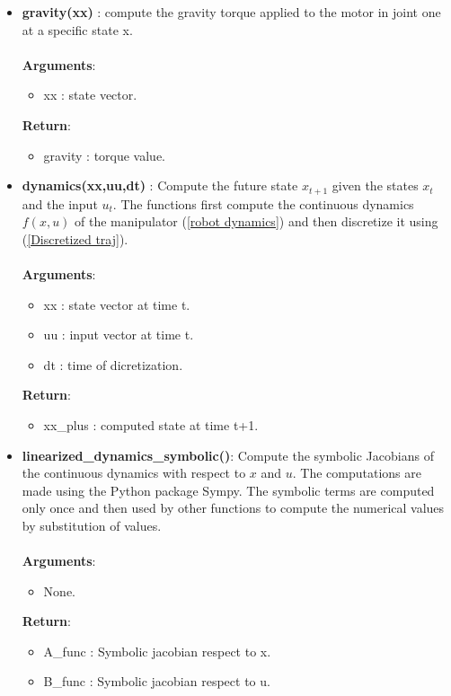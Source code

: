 \begin{itemize}
    \item \textbf{gravity(xx) }: compute the gravity torque applied to the motor in joint one at a specific state x.\\\\
    \textbf{Arguments}:
    \begin{itemize}
        \item xx : state vector.
    \end{itemize}
    \textbf{Return}:
    \begin{itemize}
        \item gravity : torque value.
    \end{itemize}

    \item \textbf{dynamics(xx,uu,dt) }: Compute the future state $x_{t+1}$ given the states $x_t$ and the input $u_t$. The functions first compute the continuous dynamics $f(x,u)$ of the manipulator (\ref{robot dynamics}) and then discretize it using (\ref{Discretized traj}). \\\\
    \textbf{Arguments}:
    \begin{itemize}
        \item xx : state vector at time t.
        \item uu : input vector at time t.
        \item dt : time of dicretization.
    \end{itemize}
    \textbf{Return}:
    \begin{itemize}
        \item xx\_plus : computed state at time t+1. 
    \end{itemize}

    \item \textbf{linearized\_dynamics\_symbolic()}: Compute the symbolic Jacobians of the continuous dynamics with respect to $x$ and $u$. The computations are made using the Python package Sympy. The symbolic terms are computed only once and then used by other functions to compute the numerical values by substitution of values.
  \\\\
    \textbf{Arguments}:
    \begin{itemize}
        \item None.
    \end{itemize}
    \textbf{Return}:
    \begin{itemize}
        \item A\_func : Symbolic jacobian respect to x.
        \item B\_func : Symbolic jacobian respect to u.
    \end{itemize}


\end{itemize}
